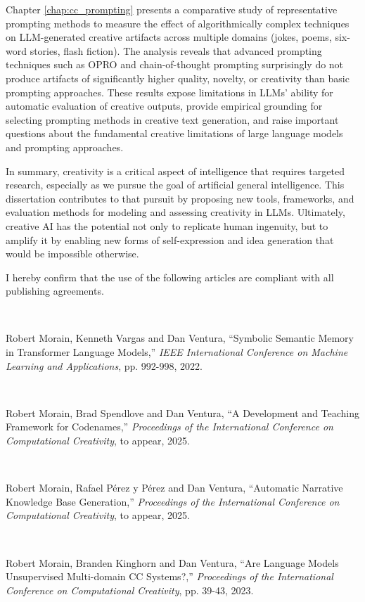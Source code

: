 \documentclass[phd,electronic,oneside,twosidetoc,letterpaper,chaptercenter,parttop,lof]{byumsphd}
\begin{document}
Chapter \ref{chap:cc_prompting} presents a comparative study of representative prompting methods to measure the effect of algorithmically complex techniques on LLM-generated creative artifacts across multiple domains (jokes, poems, six-word stories, flash fiction). 
The analysis reveals that advanced prompting techniques such as OPRO and chain-of-thought prompting surprisingly do not produce artifacts of significantly higher quality, novelty, or creativity than basic prompting approaches. 
These results expose limitations in LLMs' ability for automatic evaluation of creative outputs, provide empirical grounding for selecting prompting methods in creative text generation, and raise important questions about the fundamental creative limitations of large language models and prompting approaches.

In summary, creativity is a critical aspect of intelligence that requires targeted research, especially as we pursue the goal of artificial general intelligence. 
This dissertation contributes to that pursuit by proposing new tools, frameworks, and evaluation methods for modeling and assessing creativity in LLMs. 
Ultimately, creative AI has the potential not only to replicate human ingenuity, but to amplify it by enabling new forms of self-expression and idea generation that would be impossible otherwise.

\pagebreak

I hereby confirm that the use of the following articles are compliant with all publishing agreements.


\

\noindent
Robert Morain, Kenneth Vargas and Dan Ventura, ``Symbolic Semantic Memory in Transformer Language Models,'' \textit{IEEE International Conference on Machine Learning and Applications}, pp. 992-998, 2022. 

\

\noindent
Robert Morain, Brad Spendlove and Dan Ventura, ``A Development and Teaching Framework for Codenames,'' \textit{Proceedings of the International Conference on Computational Creativity}, to appear, 2025. 

\

\noindent
Robert Morain, Rafael Pérez y Pérez and Dan Ventura, ``Automatic Narrative Knowledge Base Generation,'' \textit{Proceedings of the International Conference on Computational Creativity}, to appear, 2025.

\

\noindent
Robert Morain, Branden Kinghorn and Dan Ventura, ``Are Language Models Unsupervised Multi-domain CC Systems?,'' \textit{Proceedings of the International Conference on Computational Creativity}, pp. 39-43, 2023. 
\end{document}
